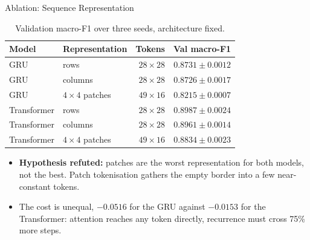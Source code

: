 \begin{frame}{Ablation: Sequence Representation}
\begin{table}
\centering
\caption{Validation macro-F1 over three seeds, architecture fixed.}
\label{tab:ablation-representation}
\small
\begin{tabular}{llrr}
\toprule
\textbf{Model} & \textbf{Representation} & \textbf{Tokens} & \textbf{Val macro-F1} \\
\midrule
GRU & rows                 & $28 \times 28$ & $\mathbf{0.8731 \pm 0.0012}$ \\
GRU & columns              & $28 \times 28$ & $0.8726 \pm 0.0017$ \\
GRU & $4\times4$ patches   & $49 \times 16$ & $0.8215 \pm 0.0007$ \\
\midrule
Transformer & rows               & $28 \times 28$ & $\mathbf{0.8987 \pm 0.0024}$ \\
Transformer & columns            & $28 \times 28$ & $0.8961 \pm 0.0014$ \\
Transformer & $4\times4$ patches & $49 \times 16$ & $0.8834 \pm 0.0023$ \\
\bottomrule
\end{tabular}
\end{table}

\small
\begin{itemize}
    \item \textbf{Hypothesis refuted:} patches are the worst representation for both models, not the
          best. Patch tokenisation gathers the empty border into a few near-constant tokens.
    \item The cost is unequal, $-0.0516$ for the GRU against $-0.0153$ for the Transformer:
          attention reaches any token directly, recurrence must cross 75\% more steps.
\end{itemize}
\end{frame}

